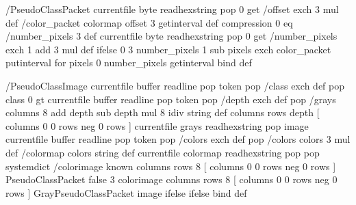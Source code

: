 /PseudoClassPacket
{
  currentfile byte readhexstring pop 0 get
  /offset exch 3 mul def
  /color_packet colormap offset 3 getinterval def
  compression 0 eq
  {
    /number_pixels 3 def
  }
  {
    currentfile byte readhexstring pop 0 get
    /number_pixels exch 1 add 3 mul def
  } ifelse
  0 3 number_pixels 1 sub
  {
    pixels exch color_packet putinterval
  } for
  pixels 0 number_pixels getinterval
} bind def

/PseudoClassImage
{
  currentfile buffer readline pop
  token pop /class exch def pop
  class 0 gt
  {
    currentfile buffer readline pop
    token pop /depth exch def pop
    /grays columns 8 add depth sub depth mul 8 idiv string def
    columns rows depth
    [
      columns 0 0
      rows neg 0 rows
    ]
    { currentfile grays readhexstring pop } image
  }
  {
    currentfile buffer readline pop
    token pop /colors exch def pop
    /colors colors 3 mul def
    /colormap colors string def
    currentfile colormap readhexstring pop pop
    systemdict /colorimage known
    {
      columns rows 8
      [
        columns 0 0
        rows neg 0 rows
      ]
      { PseudoClassPacket } false 3 colorimage
    }
    {
      columns rows 8
      [
        columns 0 0
        rows neg 0 rows
      ]
      { GrayPseudoClassPacket } image
    } ifelse
  } ifelse
} bind def

